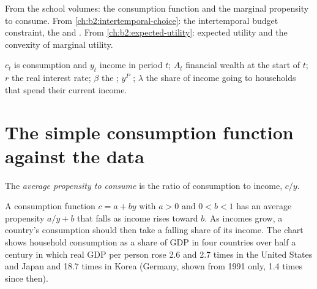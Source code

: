 \begin{recall}
From the school volumes: the consumption function and the marginal propensity to consume. From
\cref{ch:b2:intertemporal-choice}: the intertemporal budget constraint, the  and .
From \cref{ch:b2:expected-utility}: expected utility and the convexity of marginal utility.
\end{recall}

\begin{notation}\label{not:b2:consumption:symbols}
$c_t$ is consumption and $y_t$ income in period $t$; $A_t$ financial wealth at the start of $t$; $r$ the real interest rate; $\beta$ the
; $y^P$ ; $\lambda$ the share of income going to households that spend their current income.
\end{notation}

\section{The simple consumption function against the data}\label{sec:b2:consumption:keynesian}

\begin{definition}\label{def:b2:consumption:apc}
The \emph{average propensity to consume} is the ratio of consumption to income,
$c/y$.
\end{definition}

A consumption function $c = a + by$ with $a > 0$ and $0 < b < 1$ has an average propensity $a/y + b$ that falls as income rises toward $b$. As incomes
grow, a country's consumption should then take a falling share of its income. The chart shows household consumption as a
share of GDP in four countries over half a century in which real GDP per person rose 2.6 and 2.7 times in the United States
and Japan and 18.7 times in Korea (Germany, shown from 1991 only, 1.4 times since then).

